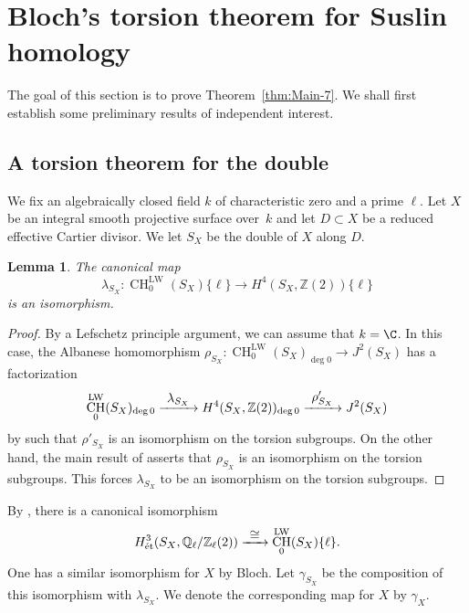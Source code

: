 \documentclass[JEP,XML,SOM,Unicode,published]{cedram}
\def\To#1{\mathchoice{\xrightarrow{\textstyle\kern4pt#1\kern3pt}}{\stackrel{#1}{\longrightarrow}}{}{}}
\newcommand{\LW}{\mathrm{LW}}
\newtheorem{lem}[thm]{Lemma}
\theoremstyle{definition}
\newcommand{\thmref}{Theorem~\ref}
\newcommand{\Q}{{\mathbb Q}}
\newcommand{\Z}{{\mathbb Z}}
\DeclareMathOperator{\CH}{CH}
\newcommand{\et}{{\textup{ét}}}\let\etl\et
\begin{document}
\section{Bloch's torsion theorem for Suslin homology}
\label{sec:Suslin-tor}
The goal of this section is to prove \thmref{thm:Main-7}.
We shall first establish some preliminary results of independent
interest.

\subsection{A torsion theorem for the double}
\label{sec:Sing-tor}
We fix an algebraically closed field $k$ of characteristic zero and a prime $\ell$.
Let $X$ be an integral smooth projective surface over~$k$ and let
$D \subset X$ be a reduced effective Cartier divisor. We let $S_X$ be the
double of $X$ along $D$.

\begin{lem}\label{lem:Double-0}
The canonical map
\[
\lambda_{S_X} \colon \CH^{\LW}_0(S_X)\{\ell\} \to H^4(S_X, \Z(2))\{\ell\}
\]
is an isomorphism.
\end{lem}
\begin{proof}
By a Lefschetz principle argument, we can assume that $k = \C$.
In this case, the Albanese homomorphism $\rho_{S_X} \colon
\CH^{\LW}_0(S_X)_{\deg 0} \to J^2(S_X)$ has a factorization
\[
\CH^{\LW}_0(S_X)_{\deg 0} \To{\lambda_{S_X}} H^4(S_X, \Z(2))_{\deg 0}
\To{\rho'_{S_X}} J^2(S_X)
\]
by \cite[Th.\,8.4]{KP} such that $\rho'_{S_X}$ is an isomorphism on the
torsion subgroups. On the other hand,
the main result of \cite{BPW} asserts that $\rho_{S_X}$ is an
isomorphism on the torsion subgroups. This forces $\lambda_{S_X}$ to be an
isomorphism on the torsion subgroups.
\end{proof}

By \cite[Th.\,3.6]{Krishna-2}, there is a canonical isomorphism
\[
H^3_\et(S_X, {\Q_\ell}/{\Z_\ell}(2)) \To{\cong} \CH^{\LW}_0(S_X)\{\ell\}.
\]
One has a similar isomorphism for $X$ by Bloch.
Let $\gamma_{S_X}$ be the composition of this isomorphism with $\lambda_{S_X}$.
We denote the corresponding map for $X$ by $\gamma_X$.
\end{document}
